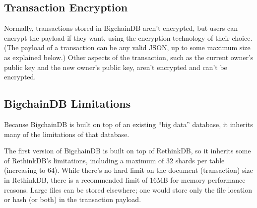 \subsection{Transaction Encryption}
Normally, transactions stored in BigchainDB aren't encrypted, but users can encrypt the payload if they want, using the encryption technology of their choice. (The payload of a transaction can be any valid JSON, up to some maximum size as explained below.) Other aspects of the transaction, such as the current owner's public key and the new owner's public key, aren't encrypted and can't be encrypted.

\subsection{BigchainDB Limitations}
Because BigchainDB is built on top of an existing ``big data'' database, it inherits many of the limitations of that database.

The first version of BigchainDB is built on top of RethinkDB, so it inherits some of RethinkDB's limitations, including a maximum of 32 shards per table (increasing to 64). While there's no hard limit on the document (transaction) size in RethinkDB, there is a recommended limit of 16MB for memory performance reasons. Large files can be stored elsewhere; one would store only the file location or hash (or both) in the transaction payload.

